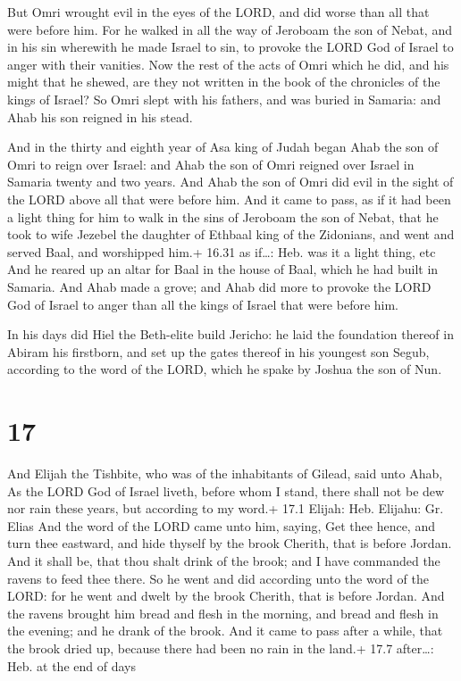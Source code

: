  But Omri wrought evil in the eyes of the LORD, and did
worse than all that were before him.  For he walked in all
the way of Jeroboam the son of Nebat, and in his sin wherewith he made
Israel to sin, to provoke the LORD God of Israel to anger with their
vanities.  Now the rest of the acts of Omri which he did,
and his might that he shewed, are they not written in the book of the
chronicles of the kings of Israel?  So Omri slept with his
fathers, and was buried in Samaria: and Ahab his son reigned in his
stead.

 And in the thirty and eighth year of Asa king of Judah
began Ahab the son of Omri to reign over Israel: and Ahab the son of
Omri reigned over Israel in Samaria twenty and two years. 
And Ahab the son of Omri did evil in the sight of the LORD above all
that were before him.  And it came to pass, as if it had
been a light thing for him to walk in the sins of Jeroboam the son of
Nebat, that he took to wife Jezebel the daughter of Ethbaal king of the
Zidonians, and went and served Baal, and worshipped him.+ 16.31 as
if\ldots: Heb. was it a light thing, etc  And he reared up
an altar for Baal in the house of Baal, which he had built in Samaria.
 And Ahab made a grove; and Ahab did more to provoke the
LORD God of Israel to anger than all the kings of Israel that were
before him.

 In his days did Hiel the Beth-elite build Jericho: he
laid the foundation thereof in Abiram his firstborn, and set up the
gates thereof in his youngest son Segub, according to the word of the
LORD, which he spake by Joshua the son of Nun.

\hypertarget{section-16}{%
\section{17}\label{section-16}}

 And Elijah the Tishbite, who was of the inhabitants of
Gilead, said unto Ahab, As the LORD God of Israel liveth, before whom I
stand, there shall not be dew nor rain these years, but according to my
word.+ 17.1 Elijah: Heb. Elijahu: Gr. Elias  And the word of
the LORD came unto him, saying,  Get thee hence, and turn
thee eastward, and hide thyself by the brook Cherith, that is before
Jordan.  And it shall be, that thou shalt drink of the
brook; and I have commanded the ravens to feed thee there. 
So he went and did according unto the word of the LORD: for he went and
dwelt by the brook Cherith, that is before Jordan.  And the
ravens brought him bread and flesh in the morning, and bread and flesh
in the evening; and he drank of the brook.  And it came to
pass after a while, that the brook dried up, because there had been no
rain in the land.+ 17.7 after\ldots: Heb. at the end of days

